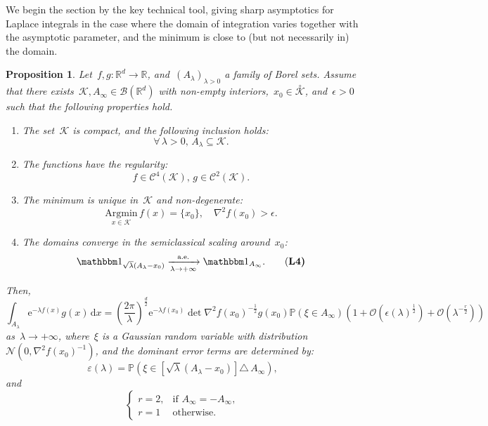 \documentclass[10pt]{article}
\renewcommand{\d}{\mathrm{d}}
\newcommand{\e}{\mathrm{e}}
\renewcommand{\P}{\mathbb{P}}
\newcommand{\R}{\mathbb{R}}
\newcommand{\1}{\mathbbm 1}
\renewcommand{\O}{\mathcal{O}}
\newtheorem{proposition}{Proposition}
\begin{document}
        We begin the section by the key technical tool, giving sharp asymptotics for Laplace integrals in the case where the domain of integration varies together with the asymptotic parameter, and the minimum is close to (but not necessarily in) the domain.
        \begin{proposition}
            \label{prop:laplace}
                Let~$f,g:\R^d\to\R$, and~$(A_\lambda)_{\lambda>0}$ a family of Borel sets. Assume that there exists~$\mathcal K,A_\infty\in \mathcal B(\R^d)$ with non-empty interiors,~$x_0\in \overset{\circ}{\mathcal K}$, and~$\epsilon >0$ such that the following properties hold.
                \begin{enumerate}[]
                    \item{The set~$\mathcal K$ is compact, and the following inclusion holds: \begin{equation}\label{eq:laplace_l1}\forall\,\lambda >0,\,A_\lambda \subseteq \mathcal K. \tag{\bf L1}\end{equation}}
                    \item{The functions have the regularity: \begin{equation}\label{eq:laplace_l2}f \in \mathcal C^{4}(\mathcal K),\, g \in \mathcal C^{2}(\mathcal K). \tag{\bf L2}\end{equation}}
                    \item{The minimum is unique in~$\mathcal K$ and non-degenerate: \begin{equation}\label{eq:laplace_l3}\underset{x\in\mathcal K}{\mathrm{Argmin}}\,f(x) = \{x_0\},\quad \nabla^2 f(x_0) > \epsilon.\tag{\bf L3}\end{equation}}
                    \item{The domains converge in the semiclassical scaling around~$x_0$: \begin{equation}\label{eq:laplace_l4} \1_{\sqrt\lambda(A_\lambda -x_0)} \xrightarrow[\lambda\to+\infty]{\text{a.e.}} \1_{A_\infty}.\tag{\bf L4}\end{equation}}
                \end{enumerate}
            Then, 
            \begin{equation}
                \label{eq:laplace_asymptotics}
                \int_{A_\lambda} \e^{-\lambda f(x)}g(x)\,\d x = \left(\frac{2\pi}{\lambda}\right)^{\frac d2}\e^{-\lambda f(x_0)}\det \nabla^2 f(x_0)^{-\frac12}g(x_0)\P(\xi \in A_\infty)\left(1+\O(\epsilon(\lambda)^{\frac12}) + \O(\lambda^{-\frac r2})\right)
            \end{equation}
            as~$\lambda\to +\infty$, where~$\xi$ is a Gaussian random variable with distribution~$\mathcal N\left(0,\nabla^2 f(x_0)^{-1}\right)$, and the dominant error terms are determined by:
            $$\varepsilon(\lambda) = \P\left(\xi \in \left[\sqrt\lambda\left(A_\lambda-x_0\right)\right] \triangle\, A_\infty\right),$$
            and
            \[\begin{cases}
                r = 2,& \text{if } A_\infty = -A_\infty,\\
                r =1 & \text{otherwise}.
            \end{cases}
            \]
        \end{proposition}
\end{document}
